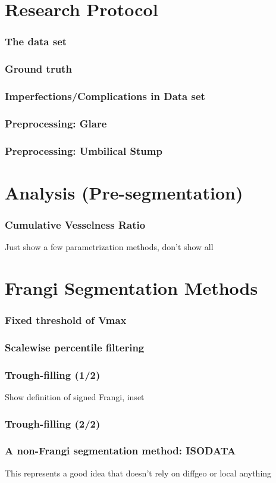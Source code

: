 \documentclass[9pt,notes]{beamer}
\begin{document}
\section{Research Protocol}
\begin{frame}
\frametitle{The data set}
\end{frame}

\begin{frame}
\frametitle{Ground truth}
\end{frame}

\begin{frame}
\frametitle{Imperfections/Complications in Data set}
\end{frame}

\begin{frame}
\frametitle{Preprocessing: Glare}
\end{frame}

\begin{frame}
\frametitle{Preprocessing: Umbilical Stump}
\end{frame}

\section{Analysis (Pre-segmentation)}

\begin{frame}
\frametitle{Cumulative Vesselness Ratio}
Just show a few parametrization methods, don't show all
\end{frame}

\section{Frangi Segmentation Methods}
\begin{frame}
\frametitle{Fixed threshold of Vmax}
\end{frame}

\begin{frame}
\frametitle{Scalewise percentile filtering}
\end{frame}

\begin{frame}
\frametitle{Trough-filling (1/2)}
Show definition of signed Frangi, inset
\end{frame}

\begin{frame}
\frametitle{Trough-filling (2/2)}
\end{frame}

\begin{frame}
\frametitle{A non-Frangi segmentation method: ISODATA}
This represents a good idea that doesn't rely on diffgeo or local anything
\end{frame}
\end{document}
